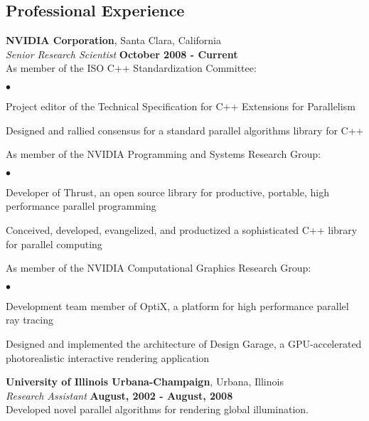 \documentclass[margin,line]{res}
\newenvironment{list2}{
  \begin{list}{$\bullet$}{%
      \setlength{\itemsep}{0in}
      \setlength{\parsep}{0in} \setlength{\parskip}{0in}
      \setlength{\topsep}{0in} \setlength{\partopsep}{0in}
      \setlength{\leftmargin}{0.2in}}}{\end{list}}
\begin{document}
\begin{resume}
\section{\sc Professional Experience}
{\bf NVIDIA Corporation}, Santa Clara, California\\
{\em Senior Research Scientist} \hfill {\bf October 2008 - Current}\\
As member of the ISO C++ Standardization Committee: \vspace*{.05in}
\begin{list2}
\item Project editor of the Technical Specification for C++ Extensions for Parallelism
\item Designed and rallied consensus for a standard parallel algorithms library for C++
\end{list2}
As member of the NVIDIA Programming and Systems Research Group: \vspace*{.05in}
\begin{list2}
\item Developer of Thrust, an open source library for productive, portable, high performance parallel programming
\item Conceived, developed, evangelized, and productized a sophisticated C++ library for parallel computing
\end{list2}
As member of the NVIDIA Computational Graphics Research Group: \vspace*{.05in}
\begin{list2}
\item Development team member of OptiX, a platform for high performance parallel ray tracing
\item Designed and implemented the architecture of Design Garage, a GPU-accelerated photorealistic interactive rendering application
\end{list2}

{\bf University of Illinois Urbana-Champaign}, Urbana, Illinois\\
{\em Research Assistant} \hfill {\bf August, 2002 - August, 2008}\\
Developed novel parallel algorithms for rendering global illumination.


\end{resume}
\end{document}
